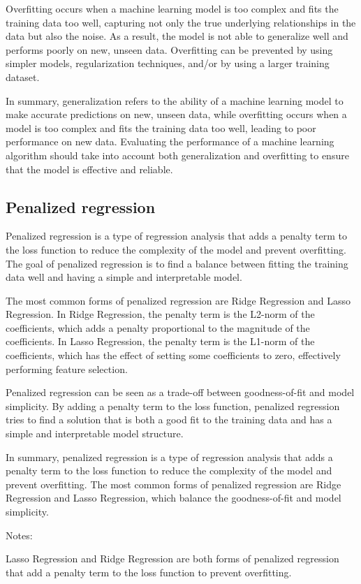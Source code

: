 \documentclass[12pt, a4paper, oneside]{article}
\begin{document}
Overfitting occurs when a machine learning model is too complex and fits the training data too well, capturing not only the true underlying relationships in the data but also the noise. As a result, the model is not able to generalize well and performs poorly on new, unseen data. Overfitting can be prevented by using simpler models, regularization techniques, and/or by using a larger training dataset.

In summary, generalization refers to the ability of a machine learning model to make accurate predictions on new, unseen data, while overfitting occurs when a model is too complex and fits the training data too well, leading to poor performance on new data. Evaluating the performance of a machine learning algorithm should take into account both generalization and overfitting to ensure that the model is effective and reliable.
\subsection{ Penalized regression }
Penalized regression is a type of regression analysis that adds a penalty term to the loss function to reduce the complexity of the model and prevent overfitting. The goal of penalized regression is to find a balance between fitting the training data well and having a simple and interpretable model.

The most common forms of penalized regression are Ridge Regression and Lasso Regression. In Ridge Regression, the penalty term is the L2-norm of the coefficients, which adds a penalty proportional to the magnitude of the coefficients. In Lasso Regression, the penalty term is the L1-norm of the coefficients, which has the effect of setting some coefficients to zero, effectively performing feature selection.

Penalized regression can be seen as a trade-off between goodness-of-fit and model simplicity. By adding a penalty term to the loss function, penalized regression tries to find a solution that is both a good fit to the training data and has a simple and interpretable model structure.

In summary, penalized regression is a type of regression analysis that adds a penalty term to the loss function to reduce the complexity of the model and prevent overfitting. The most common forms of penalized regression are Ridge Regression and Lasso Regression, which balance the goodness-of-fit and model simplicity.

Notes:

Lasso Regression and Ridge Regression are both forms of penalized regression that add a penalty term to the loss function to prevent overfitting.
\end{document}
